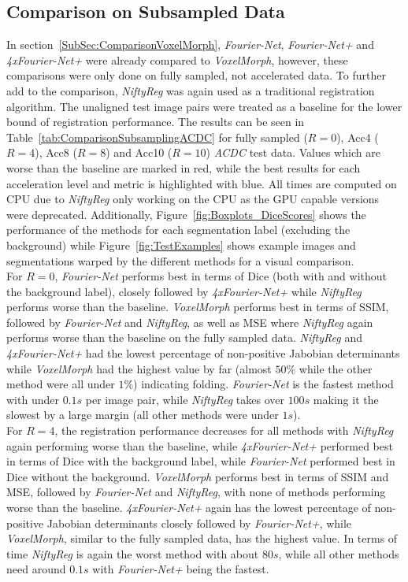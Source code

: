 \documentclass[english,version-2022-01]{uzl-thesis} %
\begin{document}
\subsection{Comparison on Subsampled Data} \label{SubSec:ResultsComparisonSubsampling}
In section~\ref{SubSec:ComparisonVoxelMorph}, \emph{Fourier-Net}, \emph{Fourier-Net+} and \emph{4xFourier-Net+} were already compared to \emph{VoxelMorph}, however, these comparisons were only done on fully sampled, not accelerated data. To further add to the comparison, \emph{NiftyReg} was again used as a traditional registration algorithm. The unaligned test image pairs were treated as a baseline for the lower bound of registration performance. The results can be seen in Table~\ref{tab:ComparisonSubsamplingACDC} for fully sampled ($R=0$), Acc4 ($R=4$), Acc8 ($R=8$) and Acc10 ($R=10$) \emph{ACDC} test data. Values which are worse than the baseline are marked in red, while the best results for each acceleration level and metric is highlighted with blue. All times are computed on CPU due to \emph{NiftyReg} only working on the CPU as the GPU capable versions were deprecated. Additionally, Figure~\ref{fig:Boxplots_DiceScores} shows the performance of the methods for each segmentation label (excluding the background) while Figure~\ref{fig:TestExamples} shows example images and segmentations warped by the different methods for a visual comparison.\\
For $R=0$, \emph{Fourier-Net} performs best in terms of Dice (both with and without the background label), closely followed by \emph{4xFourier-Net+} while \emph{NiftyReg} performs worse than the baseline. \emph{VoxelMorph} performs best in terms of SSIM, followed by \emph{Fourier-Net} and \emph{NiftyReg}, as well as MSE where \emph{NiftyReg} again performs worse than the baseline on the fully sampled data. \emph{NiftyReg} and \emph{4xFourier-Net+} had the lowest percentage of non-positive Jabobian determinants while \emph{VoxelMorph} had the highest value by far (almost $50\%$ while the other method were all under $1\%$) indicating folding. \emph{Fourier-Net} is the fastest method with under $0.1s$ per image pair, while \emph{NiftyReg} takes over $100s$ making it the slowest by a large margin (all other methods were under $1s$).\\
For $R=4$, the registration performance decreases for all methods with \emph{NiftyReg} again performing worse than the baseline, while \emph{4xFourier-Net+} performed best in terms of Dice with the background label, while \emph{Fourier-Net} performed best in Dice without the background. \emph{VoxelMorph} performs best in terms of SSIM and MSE, followed by \emph{Fourier-Net} and \emph{NiftyReg}, with none of methods performing worse than the baseline. \emph{4xFourier-Net+} again has the lowest percentage of non-positive Jabobian determinants closely followed by \emph{Fourier-Net+}, while \emph{VoxelMorph}, similar to the fully sampled data, has the highest value. In terms of time \emph{NiftyReg} is again the worst method with about $80s$, while all other methods need around $0.1s$ with \emph{Fourier-Net+} being the fastest.\\
\end{document}

